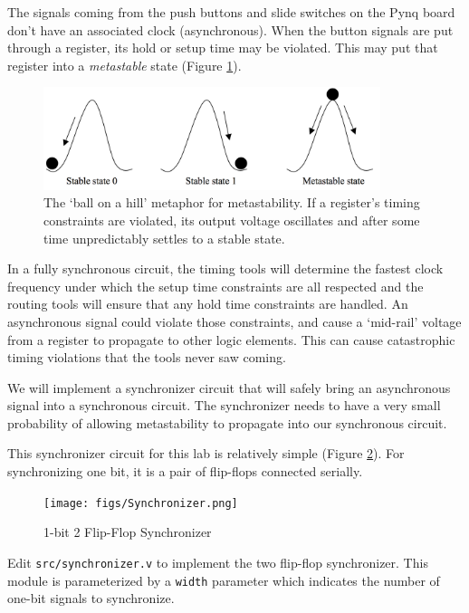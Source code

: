 \documentclass[11pt]{article}
\begin{document}
The signals coming from the push buttons and slide switches on the Pynq board don't have an associated clock (asynchronous).
When the button signals are put through a register, its hold or setup time may be violated.
This may put that register into a \textit{metastable} state (Figure \ref{fig:metastability}).

\begin{figure}
  \centerline{\includegraphics[height=3cm]{figs/lab2_fig3.png}}
  \caption{The `ball on a hill' metaphor for metastability. If a register's timing constraints are violated, its output voltage oscillates and after some time unpredictably settles to a stable state.}
  \label{fig:metastability}
\end{figure}

In a fully synchronous circuit, the timing tools will determine the fastest clock frequency under which the setup time constraints are all respected and the routing tools will ensure that any hold time constraints are handled.
An asynchronous signal could violate those constraints, and cause a `mid-rail' voltage from a register to propagate to other logic elements.
This can cause catastrophic timing violations that the tools never saw coming.

We will implement a synchronizer circuit that will safely bring an asynchronous signal into a synchronous circuit.
The synchronizer needs to have a very small probability of allowing metastability to propagate into our synchronous circuit.

This synchronizer circuit for this lab is relatively simple (Figure \ref{fig:synchronizer}).
For synchronizing one bit, it is a pair of flip-flops connected serially.

\begin{figure}[H]
  \vspace{0.5cm}
  \centerline{\texttt{[image: figs/Synchronizer.png]}}
  \caption{1-bit 2 Flip-Flop Synchronizer}
  \label{fig:synchronizer}
\end{figure}

Edit \verb|src/synchronizer.v| to implement the two flip-flop synchronizer.
This module is parameterized by a \verb|width| parameter which indicates the number of one-bit signals to synchronize.
\end{document}
